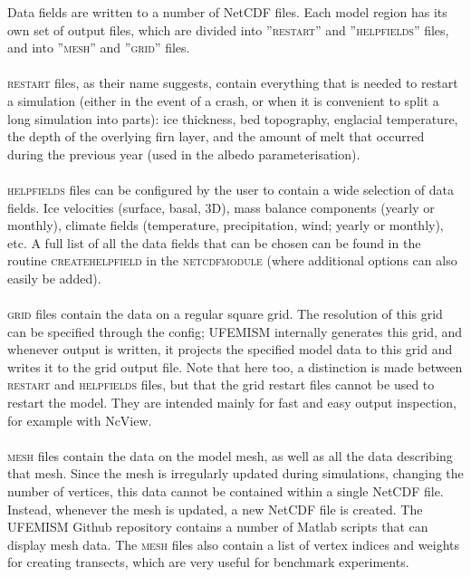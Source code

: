 \documentclass{article}
\begin{document}
Data fields are written to a number of NetCDF files. Each model region has its own set of output files, which are divided into ''\textsc{restart}'' and ''\textsc{help\textunderscore fields}'' files, and into ''\textsc{mesh}'' and ''\textsc{grid}'' files.\\
\\
\textsc{restart} files, as their name suggests, contain everything that is needed to restart a simulation (either in the event of a crash, or when it is convenient to split a long simulation into parts): ice thickness, bed topography, englacial temperature, the depth of the overlying firn layer, and the amount of melt that occurred during the previous year (used in the albedo parameterisation).\\
\\
\textsc{help\textunderscore fields} files can be configured by the user to contain a wide selection of data fields. Ice velocities (surface, basal, 3D), mass balance components (yearly or monthly), climate fields (temperature, precipitation, wind; yearly or monthly), etc. A full list of all the data fields that can be chosen can be found in the routine \textsc{create\textunderscore help\textunderscore field} in the \textsc{netcdf\textunderscore module} (where additional options can also easily be added).\\
\\
\textsc{grid} files contain the data on a regular square grid. The resolution of this grid can be specified through the config; UFEMISM internally generates this grid, and whenever output is written, it projects the specified model data to this grid and writes it to the grid output file. Note that here too, a distinction is made between \textsc{restart} and \textsc{help\textunderscore fields} files, but that the grid restart files cannot be used to restart the model. They are intended mainly for fast and easy output inspection, for example with NcView.\\
\\
\textsc{mesh} files contain the data on the model mesh, as well as all the data describing that mesh. Since the mesh is irregularly updated during simulations, changing the number of vertices, this data cannot be contained within a single NetCDF file. Instead, whenever the mesh is updated, a new NetCDF file is created. The UFEMISM Github repository contains a number of Matlab scripts that can display mesh data. The \textsc{mesh} files also contain a list of vertex indices and weights for creating transects, which are very useful for benchmark experiments.
\end{document}
